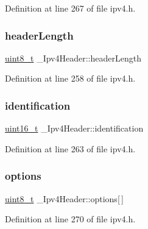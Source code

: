 Definition at line 267 of file ipv4.\+h.

\mbox{\label{struct__Ipv4Header_a506650285232d83505d5e7fe2badf912}} 
\subsubsection{\texorpdfstring{header\+Length}{headerLength}}
{\footnotesize\ttfamily \hyperlink{stdint_8h_aba7bc1797add20fe3efdf37ced1182c5}{uint8\+\_\+t} \+\_\+\+Ipv4\+Header\+::header\+Length}



Definition at line 258 of file ipv4.\+h.

\mbox{\label{struct__Ipv4Header_ab002286efcfac75b6e92264b55d794f2}} 
\subsubsection{\texorpdfstring{identification}{identification}}
{\footnotesize\ttfamily \hyperlink{stdint_8h_a273cf69d639a59973b6019625df33e30}{uint16\+\_\+t} \+\_\+\+Ipv4\+Header\+::identification}



Definition at line 263 of file ipv4.\+h.

\mbox{\label{struct__Ipv4Header_a64b8877771d8051a24db4a030c12abee}} 
\subsubsection{\texorpdfstring{options}{options}}
{\footnotesize\ttfamily \hyperlink{stdint_8h_aba7bc1797add20fe3efdf37ced1182c5}{uint8\+\_\+t} \+\_\+\+Ipv4\+Header\+::options\mbox{[}$\,$\mbox{]}}



Definition at line 270 of file ipv4.\+h.

\mbox{\label{struct__Ipv4Header_aa32a265fce309986adbeb3710d833638}} 

